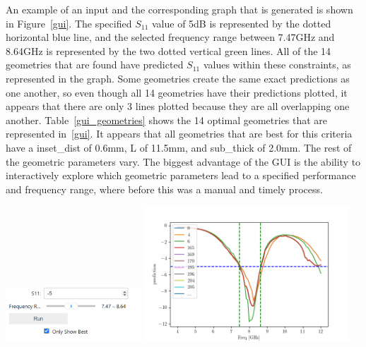 \documentclass[conference]{IEEEtran}
\newenvironment{Figure}
    {\par\medskip\noindent\minipage{\linewidth}}
    {\endminipage\par\medskip}
\begin{document}
An example of an input and the corresponding graph that is generated is shown in Figure~\ref{gui}. The specified $S_{11}$ value of 5dB is represented by the dotted horizontal blue line, and the selected frequency range between 7.47GHz and 8.64GHz is represented by the two dotted vertical green lines. All of the 14 geometries that are found have predicted $S_{11}$ values within these constraints, as represented in the graph. Some geometries create the same exact predictions as one another, so even though all 14 geometries have their predictions plotted, it appears that there are only 3 lines plotted because they are all overlapping one another. Table~\ref{gui_geometries} shows the 14 optimal geometries that are represented in~\ref{gui}. It appears that all geometries that are best for this criteria have a inset\_dist of 0.6mm, L of 11.5mm, and sub\_thick of 2.0mm. The rest of the geometric parameters vary. The biggest advantage of the GUI is the ability to interactively explore which geometric parameters lead to a specified performance and frequency range, where before this was a manual and timely process. 

\begin{Figure}
    \centering
    \includegraphics[width=2in]{gui_input}
    \includegraphics[width=3in]{gui_graph}
    \label{gui}
\end{Figure}
\end{document}
